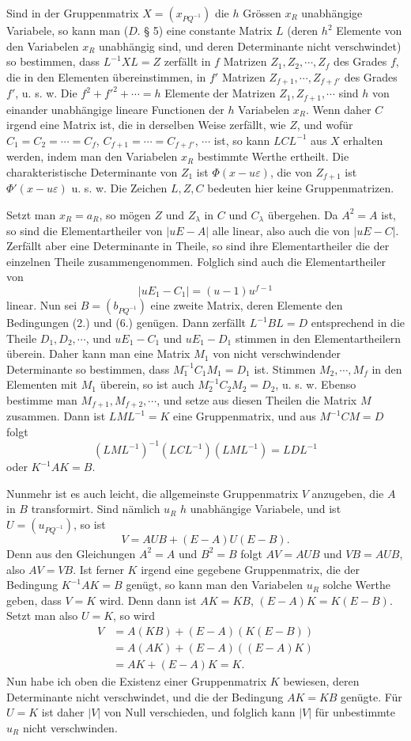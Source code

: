 \documentclass[11pt]{article}
\newcommand{\eps}{\varepsilon}
\begin{document}
Sind in der Gruppenmatrix $X=(x_{PQ^{-1}})$ die $h$ Grössen $x_R$ unabhängige Variabele, so kann man ($D.$ § 5) eine constante Matrix $L$ (deren $h^2$ Elemente von den Variabelen $x_R$ unabhängig sind, und deren Determinante nicht verschwindet) so bestimmen, dass $L^{-1}XL=Z$ zerfällt in $f$ Matrizen $Z_1,Z_2,\cdots,Z_f$ des Grades $f$, die in den Elementen übereinstimmen, in $f'$ Matrizen $Z_{f+1},\cdots,Z_{f+f'}$ des Grades $f'$, u. s. w. Die $f^2+f'^2+\cdots=h$ Elemente der Matrizen $Z_1,Z_{f+1},\cdots$ sind $h$ von einander unabhängige lineare Functionen der $h$ Variabelen $x_R$. Wenn daher $C$ irgend eine Matrix ist, die in derselben Weise zerfällt, wie $Z$, und wofür $C_1=C_2=\cdots=C_f$, $C_{f+1}=\cdots=C_{f+f'}$, $\cdots$ ist, so kann $LCL^{-1}$ aus $X$ erhalten werden, indem man den Variabelen $x_R$ bestimmte Werthe ertheilt. Die charakteristische Determinante von $Z_1$ ist $\Phi(x-u\eps)$, die von $Z_{f+1}$ ist $\Phi'(x-u\eps)$ u. s. w. Die Zeichen $L,Z,C$ bedeuten hier keine Gruppenmatrizen.

Setzt man $x_R=a_R$, so mögen $Z$ und $Z_\lambda$ in $C$ und $C_\lambda$ übergehen. Da $A^2=A$ ist, so sind die Elementartheiler von $|uE-A|$ alle linear, also auch die von $|uE-C|$. Zerfällt aber eine Determinante in Theile, so sind ihre Elementartheiler die der einzelnen Theile zusammengenommen. Folglich sind auch die Elementartheiler von
\[
|uE_1-C_1|=(u-1)u^{f-1}
\]
linear. Nun sei $B=(b_{PQ^{-1}})$ eine zweite Matrix, deren Elemente den Bedingungen (2.) und (6.) genügen. Dann zerfällt $L^{-1}BL=D$ entsprechend in die Theile $D_1,D_2,\cdots$, und $uE_1-C_1$ und $uE_1-D_1$ stimmen in den Elementartheilern überein. Daher kann man eine Matrix $M_1$ von nicht verschwindender Determinante so bestimmen, dass $M_1^{-1}C_1M_1=D_1$ ist. Stimmen $M_2,\cdots,M_f$ in den Elementen mit $M_1$ überein, so ist auch $M_2^{-1}C_2M_2=D_2$, u. s. w. Ebenso bestimme man $M_{f+1},M_{f+2},\cdots$, und setze aus diesen Theilen die Matrix $M$ zusammen. Dann ist $LML^{-1}=K$ eine Gruppenmatrix, und aus $M^{-1}CM=D$ folgt
\[
(LML^{-1})^{-1}(LCL^{-1})(LML^{-1})=LDL^{-1}
\]
oder $K^{-1}AK=B$.

Nunmehr ist es auch leicht, die allgemeinste Gruppenmatrix $V$ anzugeben, die $A$ in $B$ transformirt. Sind nämlich $u_R$ $h$ unabhängige Variabele, und ist $U=(u_{PQ^{-1}})$, so ist
\begin{equation}\tag{8.}
V=AUB+(E-A)U(E-B).
\end{equation}
Denn aus den Gleichungen $A^2=A$ und $B^2=B$ folgt $AV=AUB$ und $VB=AUB$, also $AV=VB$. Ist ferner $K$ irgend eine gegebene Gruppenmatrix, die der Bedingung $K^{-1}AK=B$ genügt, so kann man den Variabelen $u_R$ solche Werthe geben, dass $V=K$ wird. Denn dann ist $AK=KB$, $(E-A)K=K(E-B)$. Setzt man also $U=K$, so wird
\[
\begin{aligned}
V&=A(KB)+(E-A)(K(E-B))\\
&=A(AK)+(E-A)((E-A)K)\\
&=AK+(E-A)K=K.
\end{aligned}
\]
Nun habe ich oben die Existenz einer Gruppenmatrix $K$ bewiesen, deren Determinante nicht verschwindet, und die der Bedingung $AK=KB$ genügte. Für $U=K$ ist daher $|V|$ von Null verschieden, und folglich kann $|V|$ für unbestimmte $u_R$ nicht verschwinden.
\end{document}
